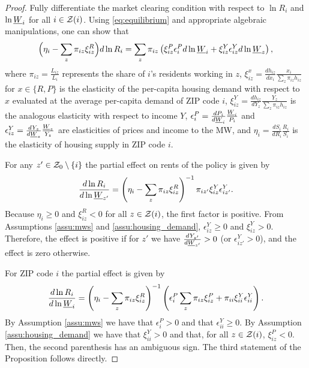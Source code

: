 \begin{proof}
    Fully differentiate the market clearing condition with respect to $\ln R_i$ 
    and $\ln \underline{W}_i$ for all $i\in\mathcal{Z}(i)$.
    Using \eqref{eq:equilibrium} and appropriate algebraic manipulations, 
    one can show that
    \begin{equation}\label{eq:diff_equilibrium}
        \Big(\eta_i - \sum_z \pi_{iz} \xi^R_{iz} \Big) d \ln R_i
        = 
        \sum_z \pi_{iz} \left(\xi^P_{iz} \epsilon_{i}^P d \ln \underline{W}_i 
                            + \xi^Y_{iz} \epsilon_{iz}^Y d \ln \underline{W}_z \right) ,
    \end{equation}
    where
    $\pi_{iz} = \frac{L_{iz}}{L_i}$ represents the share of $i$'s residents 
    working in $z$,
    $\xi_{iz}^x = \frac{d h_{iz}}{d x_i} \frac{x_i}{\sum_z \pi_{iz} h_{iz}}$ for
    $x\in\{R,P\}$ is the elasticity of the per-capita housing demand with respect
    to $x$ evaluated at the average per-capita demand of ZIP code $i$,
    $\xi_{iz}^Y = \frac{d h_{iz}}{d Y_z} \frac{Y_z}{\sum_z \pi_{iz} h_{iz}}$ is
    the analogous elasticity with respect to income $Y$,
    $\epsilon_{i}^P = \frac{d P_i}{d \underline{W}_i} \frac{\underline{W}_i}{P_i}$ and 
    $\epsilon_{iz}^Y = \frac{d Y_z}{d \underline{W}_z} \frac{\underline{W}_z}{Y_z}$ are
    elasticities of prices and income to the MW, and
    $\eta_i = \frac{d S_i}{d R_i} \frac{R_i}{S_i}$ is the elasticity 
    of housing supply in ZIP code $i$.

    For any $z'\in\mathcal{Z}_0\setminus\{i\}$ the partial effect on rents of the policy
    is given by
    $$
    \frac{d\ln R_i}{d\ln\underline{W}_{z'}} 
      = \left(\eta_i - \sum_z \pi_{iz} \xi^R_{iz}\right)^{-1} 
              \pi_{iz'}\xi^Y_{iz}\epsilon_{iz'}^Y.
    $$
    Because $\eta_i\geq0$ and $\xi^R_{iz} < 0$ for all $z\in\mathcal{Z}(i)$, 
    the first factor is positive.
    From Assumptions \ref{assu:mws} and \ref{assu:housing_demand},
    $\epsilon_{iz}^Y\geq0$ and $\xi^Y_{iz}>0$.
    Therefore, the effect is positive if for $z'$ we have 
    $\frac{d Y_{z'}}{d \underline{W}_{z'}}>0$ (or $\epsilon_{iz'}^Y>0$), 
    and the effect is zero otherwise.

    For ZIP code $i$ the partial effect is given by
    $$
    \frac{d\ln R_i}{d\ln\underline{W}_{i}} 
      = \left(\eta_i - \sum_z \pi_{iz} \xi^R_{iz}\right)^{-1} 
        \left(\epsilon_{i}^P \sum_z \pi_{iz}\xi^P_{iz} 
             + \pi_{ii}\xi^Y_{ii}\epsilon_{ii}^Y \right) .
    $$
    By Assumption \ref{assu:mws} we have that $\epsilon_{i}^P>0$ and that 
    $\epsilon_{ii}^Y\geq0$.
    By Assumption \ref{assu:housing_demand} we have that $\xi^Y_{ii}>0$ and that, 
    for all $z\in\mathcal{Z}(i)$, $\xi^P_{iz}<0$.
    Then, the second parenthesis has an ambiguous sign.
    The third statement of the Proposition follows directly.
\end{proof}

